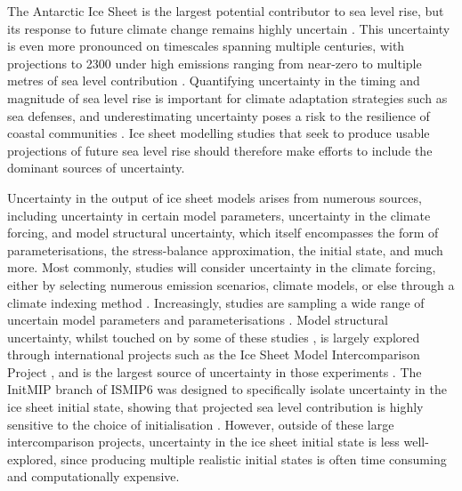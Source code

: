 \documentclass[journal abbreviation, manuscript]{copernicus}
\begin{document}
The Antarctic Ice Sheet is the largest potential contributor to sea level rise, but its response to future climate change remains highly uncertain \citep{fox-kemperOceanCryosphereSea2021}. This uncertainty is even more pronounced on timescales spanning multiple centuries, with projections to 2300 under high emissions ranging from near-zero to multiple metres of sea level contribution \citep{golledgeMultimillennialAntarcticCommitment2015,bulthuisUncertaintyQuantificationMulticentennial2019,decontoParisClimateAgreement2021,greveFutureProjectionsAntarctic2023,seroussiEvolutionAntarcticIce2024,coulonShorttermUncertaintiesLongterm2025}. Quantifying uncertainty in the timing and magnitude of sea level rise is important for climate adaptation strategies such as sea defenses, and underestimating uncertainty poses a risk to the resilience of coastal communities \citep{hinkelMeetingUserNeeds2019,koppUsableScienceManaging2019}. Ice sheet modelling studies that seek to produce usable projections of future sea level rise should therefore make efforts to include the dominant sources of uncertainty.

Uncertainty in the output of ice sheet models arises from numerous sources, including uncertainty in certain model parameters, uncertainty in the climate forcing, and model structural uncertainty, which itself encompasses the form of parameterisations, the stress-balance approximation, the initial state, and much more. Most commonly, studies will consider uncertainty in the climate forcing, either by selecting numerous emission scenarios, climate models, or else through a climate indexing method \citep[e.g.][]{decontoParisClimateAgreement2021,greveFutureProjectionsAntarctic2023}. Increasingly, studies are sampling a wide range of uncertain model parameters and parameterisations \citep{bulthuisUncertaintyQuantificationMulticentennial2019,hillQuantifyingPotentialFuture2021,coulonDisentanglingDriversFuture2024,coulonShorttermUncertaintiesLongterm2025,rosierCalibratedSeaLevel2025}. Model structural uncertainty, whilst touched on by some of these studies \citep[notably][]{coulonShorttermUncertaintiesLongterm2025}, is largely explored through international projects such as the Ice Sheet Model Intercomparison Project \citep[ISMIP6,][]{nowickiIceSheetModel2016}, and is the largest source of uncertainty in those experiments \citep{seroussiInsightsVulnerabilityAntarctic2023}. The InitMIP branch of ISMIP6 was designed to specifically isolate uncertainty in the ice sheet initial state, showing that projected sea level contribution is highly sensitive to the choice of initialisation \citep{seroussiInitMIPAntarcticaIceSheet2019}. However, outside of these large intercomparison projects, uncertainty in the ice sheet initial state is less well-explored, since producing multiple realistic initial states is often time consuming and computationally expensive.
\end{document}
